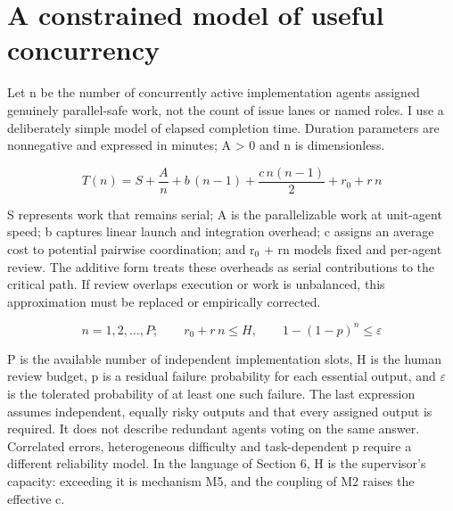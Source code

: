 \documentclass[11pt]{article}
\begin{document}
\section{A constrained model of useful concurrency}

Let n be the number of concurrently active implementation agents assigned genuinely parallel-safe work, not the count of issue lanes or named roles. I use a deliberately simple model of elapsed completion time. Duration parameters are nonnegative and expressed in minutes; A \textgreater{} 0 and n is dimensionless.

\begin{equation}
T(n) = S + \frac{A}{n} + b\,(n-1) + \frac{c\,n(n-1)}{2} + r_0 + r\,n
\label{eq:1}
\end{equation}

S represents work that remains serial; A is the parallelizable work at unit-agent speed; b captures linear launch and integration overhead; c assigns an average cost to potential pairwise coordination; and r$_0$ + rn models fixed and per-agent review. The additive form treats these overheads as serial contributions to the critical path. If review overlaps execution or work is unbalanced, this approximation must be replaced or empirically corrected.

\begin{equation}
n = 1, 2, \ldots, P; \qquad r_0 + r\,n \le H, \qquad 1 - (1-p)^{n} \le \varepsilon
\label{eq:2}
\end{equation}

P is the available number of independent implementation slots, H is the human review budget, p is a residual failure probability for each essential output, and $\varepsilon$ is the tolerated probability of at least one such failure. The last expression assumes independent, equally risky outputs and that every assigned output is required. It does not describe redundant agents voting on the same answer. Correlated errors, heterogeneous difficulty and task-dependent p require a different reliability model. In the language of Section 6, H is the supervisor's capacity: exceeding it is mechanism M5, and the coupling of M2 raises the effective c.
\end{document}
